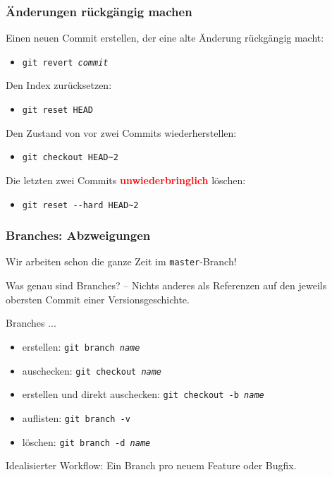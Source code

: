 \documentclass{beamer}
\begin{document}
\begin{frame}
 \frametitle{Änderungen rückgängig machen}
  


Einen neuen Commit erstellen, der eine alte Änderung rückgängig macht:
\begin{itemize}
  \item \texttt{git revert \emph{commit}}
\end{itemize}

Den Index zurücksetzen:
\begin{itemize}
  \item \texttt{git reset HEAD}
\end{itemize}

Den Zustand von vor zwei Commits wiederherstellen:
\begin{itemize}
  \item \texttt{git checkout HEAD\textasciitilde{}2}
\end{itemize}

Die letzten zwei Commits \textcolor{red}{\textbf{unwiederbringlich}} löschen:
\begin{itemize}
  \item \texttt{git reset -{}-hard HEAD\textasciitilde{}2}
\end{itemize}

  
 \end{frame}
\begin{frame}
 \frametitle{Branches: Abzweigungen}
  


Wir arbeiten schon die ganze Zeit im \texttt{master}-Branch!

\vspace{.5cm}


Was genau sind Branches? -- Nichts anderes als Referenzen auf den jeweils
obersten Commit einer Versionsgeschichte.

\vspace{.5cm}


Branches ...
\begin{itemize}
  \item erstellen: \texttt{git branch \emph{name}}
  \item auschecken: \texttt{git checkout \emph{name}}
  \item erstellen und direkt auschecken: \texttt{git checkout -b \emph{name}}
  \item auflisten: \texttt{git branch -v}
  \item löschen: \texttt{git branch -d \emph{name}}
\end{itemize}


\vspace{.5cm}

Idealisierter Workflow: Ein Branch pro neuem Feature oder Bugfix.

  
 \end{frame}
\end{document}
